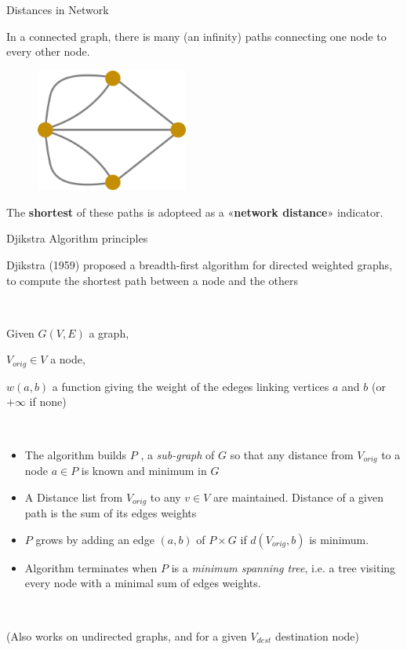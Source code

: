 \begin{frame}{Distances in Network}

In a connected graph, there is many (an infinity) paths connecting one node to every other node. 


\begin{figure}
  \includegraphics[width=5cm]{Konigsberg_graph.png}
\end{figure}


The \textbf{shortest} of these paths is adopteed as a «\textbf{network distance}» indicator.

\end{frame}

\begin{frame}{Djikstra Algorithm principles }

Djikstra (1959) proposed a breadth-first algorithm for directed weighted graphs, to compute the shortest path between a node and the others

~

Given $G(V,E)$ a graph, 

$V_{orig} \in V$  a node,

$w(a,b)$ a function giving the weight of the edeges linking vertices $a$ and $b$ (or $+\infty$ if none)

~ 

\begin{itemize}
\item The algorithm builds $P$ , a \textit{sub-graph} of $G$ so that any distance from $V_{orig}$ to a node $a\in P$ is known and minimum in $G$

\item A Distance list from $V_{orig}$ to any $v \in V $ are maintained. Distance of a given path is the sum of its edges weights 

\item $P$ grows by adding an edge $(a,b)$ of $P\times G $ if $d(V_{orig}, b)$ is minimum. 

\item Algorithm terminates when $P$ is a \textit{minimum spanning tree}, i.e. a tree visiting every node with a minimal sum of edges weights.
\end{itemize}
~


(Also works on undirected graphs, and for a given $V_{dest}$ destination node)



\end{frame}



